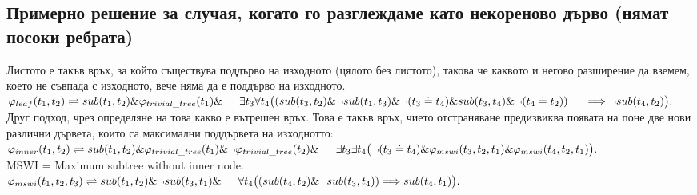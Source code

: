 \documentclass{article}
\begin{document}
\subsection{Примерно решение за случая, когато го разглеждаме като некореново дърво (нямат посоки ребрата)}
\begin{addmargin}[1em]{2em}
Листото е такъв връх, за който съществува поддърво на изходното (цялото без листото), такова че каквото и негово разширение да вземем, което не съвпада с изходното, вече няма да е поддърво на изходното. \\
$ \varphi_{leaf}(t_1, t_2) \rightleftharpoons sub(t_1, t_2) \& \varphi_{trivial\_tree}(t_1) \& \\ \indent \exists t_3 \forall t_4 \big((sub(t_3, t_2) \& \neg sub(t_1, t_3) \& \neg(t_3 \doteq t_4) \&  sub(t_3, t_4) \& \neg (t_4 \doteq t_2) ) \\ \indent \Longrightarrow  \neg sub(t_4, t_2)\big).$ \\
Друг подход, чрез определяне на това какво е вътрешен връх. Това е такъв връх, чието отстраняване предизвиква появата на поне две нови различни дървета, които са максимални поддървета на изходнотто: \\
$ \varphi_{inner}(t_1, t_2) \rightleftharpoons sub(t_1, t_2) \& \varphi_{trivial\_tree}(t_1) \& \neg \varphi_{trivial\_tree}(t_2) \& \\ \indent \exists t_3 \exists t_4 \big( \neg(t_3 \doteq t_4) \& \varphi_{mswi}(t_3, t_2, t_1) \& \varphi_{mswi}(t_4, t_2, t_1) \big). $\\
MSWI = Maximum subtree without inner node. \\
$\varphi_{mswi}(t_1, t_2, t_3) \rightleftharpoons sub(t_1, t_2) \& \neg sub(t_3, t_1) \& \\ \indent \forall t_4 \big( ( sub(t_4, t_2) \& \neg sub(t_3, t_4)) \Longrightarrow sub(t_4, t_1) \big). $
\end{addmargin}

\vskip 0.2in
\end{document}
